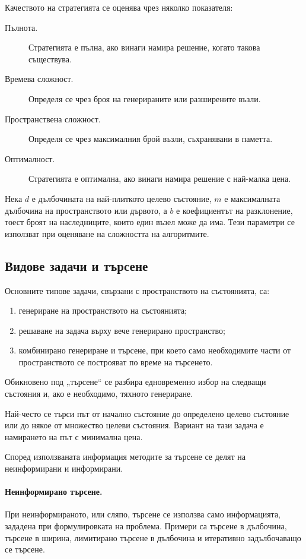 Качеството на стратегията се оценява чрез няколко показателя:

\begin{description}
\item[Пълнота.] Стратегията е пълна, ако винаги намира решение, когато такова съществува.
\item[Времева сложност.] Определя се чрез броя на генерираните или разширените възли.
\item[Пространствена сложност.] Определя се чрез максималния брой възли, съхранявани в паметта.
\item[Оптималност.] Стратегията е оптимална, ако винаги намира решение с най-малка цена.
\end{description}

Нека $d$ е дълбочината на най-плиткото целево състояние, $m$ е максималната дълбочина на пространството или дървото, а $b$ е коефициентът на разклонение, тоест броят на наследниците, които един възел може да има. Тези параметри се използват при оценяване на сложността на алгоритмите.

\subsection{Видове задачи и търсене}\label{s:25.1.2}

Основните типове задачи, свързани с пространството на състоянията, са:

\begin{enumerate}
\item генериране на пространството на състоянията;
\item решаване на задача върху вече генерирано пространство;
\item комбинирано генериране и търсене, при което само необходимите части от пространството се построяват по време на търсенето.
\end{enumerate}

Обикновено под „търсене“ се разбира едновременно избор на следващи състояния и, ако е необходимо, тяхното генериране.

Най-често се търси път от начално състояние до определено целево състояние или до някое от множество целеви състояния. Вариант на тази задача е намирането на път с минимална цена.

Според използваната информация методите за търсене се делят на неинформирани и информирани.

\paragraph{Неинформирано търсене.}
При неинформираното, или сляпо, търсене се използва само информацията, зададена при формулировката на проблема. Примери са търсене в дълбочина, търсене в ширина, лимитирано търсене в дълбочина и итеративно задълбочаващо се търсене.

